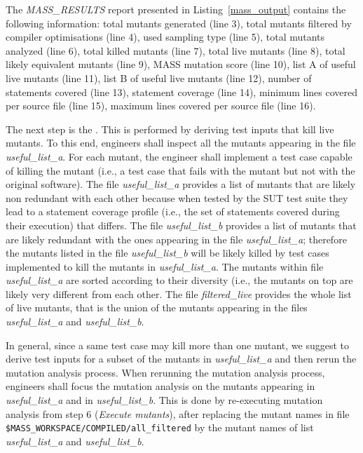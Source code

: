 The \emph{MASS\_RESULTS} report presented in Listing~\ref{mass_output} contains the following information: total mutants generated (line 3), total mutants filtered by compiler optimisations (line 4), used sampling type (line 5), total mutants analyzed (line 6), total killed mutants (line 7), total live mutants (line 8), total likely equivalent mutants (line 9), MASS mutation score (line 10), list A of useful live mutants (line 11), list B of useful live mutants (line 12), number of statements covered (line 13), statement coverage (line 14), minimum lines covered per source file (line 15), maximum lines covered per source file (line 16).
\ENDCHANGEDFINAL

The next step is the . This is performed by deriving test inputs that kill live mutants.
To this end, engineers shall inspect all the mutants appearing in the file \emph{useful\_list\_a}. For each mutant, the engineer shall implement a test case capable of killing the mutant (i.e., a test case that fails with the mutant but not with the original software).
The file \emph{useful\_list\_a} provides a list of mutants that are likely non redundant with each other because when tested by the SUT test suite they lead to a statement coverage profile (i.e., the set of statements covered during their execution) that differs.
The file \emph{useful\_list\_b} provides a list of mutants that are likely redundant with the ones appearing in the file \emph{useful\_list\_a}; therefore the mutants listed in the file \emph{useful\_list\_b} will be likely killed by test cases implemented to kill the mutants in \emph{useful\_list\_a}.
The mutants within file \emph{useful\_list\_a} are sorted according to their diversity (i.e., the mutants on top are likely very different from each other.
The file \emph{filtered\_live} provides the whole list of live mutants, that is the union of the mutants appearing in the files
\emph{useful\_list\_a} and \emph{useful\_list\_b}.

In general, since a same test case may kill more than one mutant, we suggest to derive test inputs for a subset of the mutants in \emph{useful\_list\_a} and then rerun the mutation analysis process. When rerunning the mutation analysis process, engineers shall focus the mutation analysis on the mutants appearing in \emph{useful\_list\_a} and in \emph{useful\_list\_b}. This is done by re-executing mutation analysis from step 6 (\emph{Execute mutants}), after replacing the mutant names in file \texttt{\$MASS\_WORKSPACE/COMPILED/all\_filtered} by the mutant names of list \emph{useful\_list\_a} and \emph{useful\_list\_b}.

